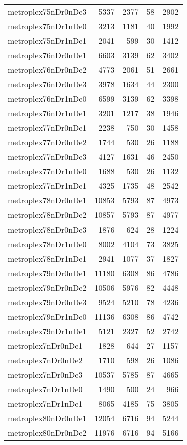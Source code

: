 \begin{longtable}{lrrrr}
metroplex75nDr0nDe3 & 5337 & 2377 & 58 & 2902 \\
metroplex75nDr1nDe0 & 3213 & 1181 & 40 & 1992 \\
metroplex75nDr1nDe1 & 2041 & 599 & 30 & 1412 \\
metroplex76nDr0nDe1 & 6603 & 3139 & 62 & 3402 \\
metroplex76nDr0nDe2 & 4773 & 2061 & 51 & 2661 \\
metroplex76nDr0nDe3 & 3978 & 1634 & 44 & 2300 \\
metroplex76nDr1nDe0 & 6599 & 3139 & 62 & 3398 \\
metroplex76nDr1nDe1 & 3201 & 1217 & 38 & 1946 \\
metroplex77nDr0nDe1 & 2238 & 750 & 30 & 1458 \\
metroplex77nDr0nDe2 & 1744 & 530 & 26 & 1188 \\
metroplex77nDr0nDe3 & 4127 & 1631 & 46 & 2450 \\
metroplex77nDr1nDe0 & 1688 & 530 & 26 & 1132 \\
metroplex77nDr1nDe1 & 4325 & 1735 & 48 & 2542 \\
metroplex78nDr0nDe1 & 10853 & 5793 & 87 & 4973 \\
metroplex78nDr0nDe2 & 10857 & 5793 & 87 & 4977 \\
metroplex78nDr0nDe3 & 1876 & 624 & 28 & 1224 \\
metroplex78nDr1nDe0 & 8002 & 4104 & 73 & 3825 \\
metroplex78nDr1nDe1 & 2941 & 1077 & 37 & 1827 \\
metroplex79nDr0nDe1 & 11180 & 6308 & 86 & 4786 \\
metroplex79nDr0nDe2 & 10506 & 5976 & 82 & 4448 \\
metroplex79nDr0nDe3 & 9524 & 5210 & 78 & 4236 \\
metroplex79nDr1nDe0 & 11136 & 6308 & 86 & 4742 \\
metroplex79nDr1nDe1 & 5121 & 2327 & 52 & 2742 \\
metroplex7nDr0nDe1 & 1828 & 644 & 27 & 1157 \\
metroplex7nDr0nDe2 & 1710 & 598 & 26 & 1086 \\
metroplex7nDr0nDe3 & 10537 & 5785 & 87 & 4665 \\
metroplex7nDr1nDe0 & 1490 & 500 & 24 & 966 \\
metroplex7nDr1nDe1 & 8065 & 4185 & 75 & 3805 \\
metroplex80nDr0nDe1 & 12054 & 6716 & 94 & 5244 \\
metroplex80nDr0nDe2 & 11976 & 6716 & 94 & 5166 \\

\end{longtable}
